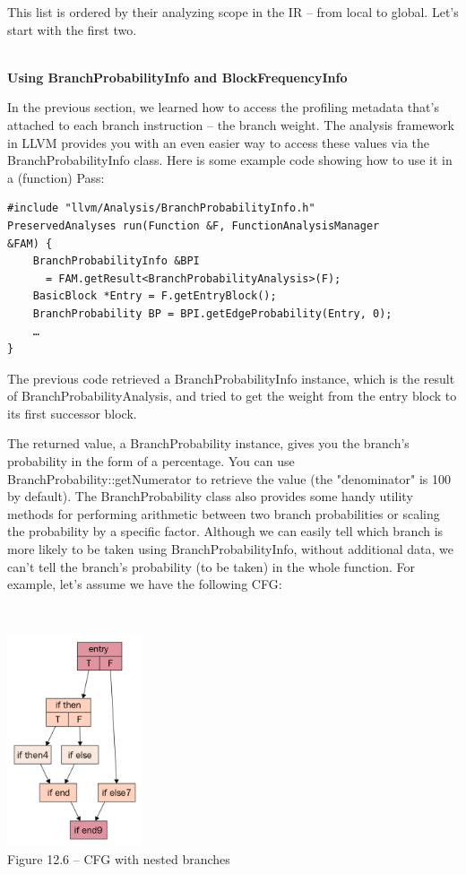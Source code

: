 This list is ordered by their analyzing scope in the IR – from local to global. Let's start with the first two.

\hspace*{\fill} \\ %
\noindent
\textbf{Using BranchProbabilityInfo and BlockFrequencyInfo}

In the previous section, we learned how to access the profiling metadata that's attached to each branch instruction – the branch weight. The analysis framework in LLVM provides you with an even easier way to access these values via the BranchProbabilityInfo class. Here is some example code showing how to use it in a (function) Pass:

\begin{lstlisting}[style=styleCXX]
#include "llvm/Analysis/BranchProbabilityInfo.h"
PreservedAnalyses run(Function &F, FunctionAnalysisManager
&FAM) {
	BranchProbabilityInfo &BPI
	  = FAM.getResult<BranchProbabilityAnalysis>(F);
	BasicBlock *Entry = F.getEntryBlock();
	BranchProbability BP = BPI.getEdgeProbability(Entry, 0);
	…
}
\end{lstlisting}

The previous code retrieved a BranchProbabilityInfo instance, which is the result of BranchProbabilityAnalysis, and tried to get the weight from the entry block to its first successor block.

The returned value, a BranchProbability instance, gives you the branch's probability in the form of a percentage. You can use BranchProbability::getNumerator to retrieve the value (the "denominator" is 100 by default). The BranchProbability class also provides some handy utility methods for performing arithmetic between two branch probabilities or scaling the probability by a specific factor. Although we can easily tell which branch is more likely to be taken using BranchProbabilityInfo, without additional data, we can't tell the branch's probability (to be taken) in the whole function. For example, let's assume we have the following CFG:

\hspace*{\fill} \\ %
\begin{center}
\includegraphics[width=0.3\textwidth]{content/3/chapter12/images/6.png}\\
Figure 12.6 – CFG with nested branches
\end{center}

